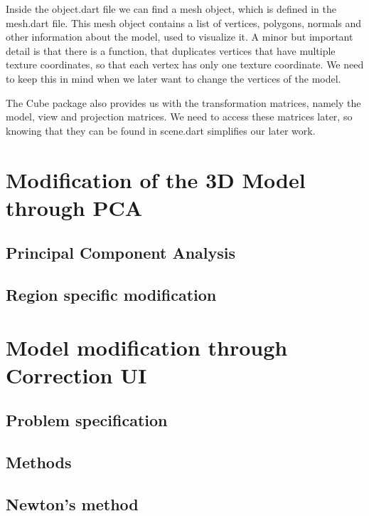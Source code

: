 Inside the object.dart file we can find a mesh object, which is defined in the mesh.dart file. This mesh object contains a list of vertices, polygons,
normals and other information about the model, used to visualize it. A minor but important detail is that there is a function,
that duplicates vertices that have multiple texture coordinates, so that each vertex has only one texture coordinate. We need to keep this in mind 
when we later want to change the vertices of the model.

The Cube package also provides us with the transformation matrices, namely the model, view and projection matrices. We need to access these matrices later,
so knowing that they can be found in scene.dart simplifies our later work.

\section{Modification of the 3D Model through PCA}

\subsection{Principal Component Analysis}

\subsection{Region specific modification}

\section{Model modification through Correction UI}

\subsection{Problem specification}

\subsection{Methods}

\subsection{Newton's method}


